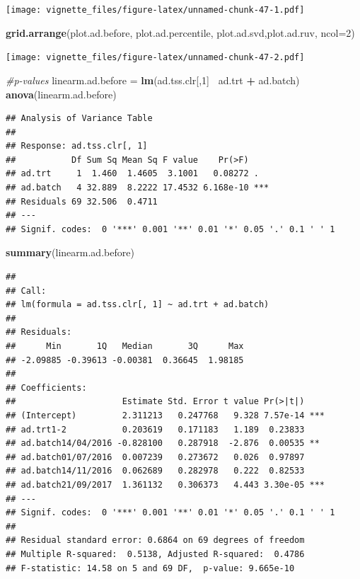 \documentclass[]{book}
\newenvironment{Shaded}{\begin{snugshade}}{\end{snugshade}}
\newcommand{\KeywordTok}[1]{\textcolor[rgb]{0.13,0.29,0.53}{\textbf{#1}}}
\newcommand{\DataTypeTok}[1]{\textcolor[rgb]{0.13,0.29,0.53}{#1}}
\newcommand{\DecValTok}[1]{\textcolor[rgb]{0.00,0.00,0.81}{#1}}
\newcommand{\StringTok}[1]{\textcolor[rgb]{0.31,0.60,0.02}{#1}}
\newcommand{\CommentTok}[1]{\textcolor[rgb]{0.56,0.35,0.01}{\textit{#1}}}
\newcommand{\OperatorTok}[1]{\textcolor[rgb]{0.81,0.36,0.00}{\textbf{#1}}}
\newcommand{\NormalTok}[1]{#1}
\begin{document}
\texttt{[image: vignette\_files/figure-latex/unnamed-chunk-47-1.pdf]}

\begin{Shaded}
\begin{Highlighting}[]
\KeywordTok{grid.arrange}\NormalTok{(plot.ad.before, plot.ad.percentile, plot.ad.svd,plot.ad.ruv, }\DataTypeTok{ncol=}\DecValTok{2}\NormalTok{)}
\end{Highlighting}
\end{Shaded}

\texttt{[image: vignette\_files/figure-latex/unnamed-chunk-47-2.pdf]}

\begin{Shaded}
\begin{Highlighting}[]
\CommentTok{#p-values}
\NormalTok{linearm.ad.before =}\StringTok{ }\KeywordTok{lm}\NormalTok{(ad.tss.clr[,}\DecValTok{1}\NormalTok{]}\OperatorTok{~}\StringTok{ }\NormalTok{ad.trt }\OperatorTok{+}\StringTok{ }\NormalTok{ad.batch)}
\KeywordTok{anova}\NormalTok{(linearm.ad.before)}
\end{Highlighting}
\end{Shaded}

\begin{verbatim}
## Analysis of Variance Table
## 
## Response: ad.tss.clr[, 1]
##           Df Sum Sq Mean Sq F value    Pr(>F)    
## ad.trt     1  1.460  1.4605  3.1001   0.08272 .  
## ad.batch   4 32.889  8.2222 17.4532 6.168e-10 ***
## Residuals 69 32.506  0.4711                      
## ---
## Signif. codes:  0 '***' 0.001 '**' 0.01 '*' 0.05 '.' 0.1 ' ' 1
\end{verbatim}

\begin{Shaded}
\begin{Highlighting}[]
\KeywordTok{summary}\NormalTok{(linearm.ad.before)}
\end{Highlighting}
\end{Shaded}

\begin{verbatim}
## 
## Call:
## lm(formula = ad.tss.clr[, 1] ~ ad.trt + ad.batch)
## 
## Residuals:
##      Min       1Q   Median       3Q      Max 
## -2.09885 -0.39613 -0.00381  0.36645  1.98185 
## 
## Coefficients:
##                     Estimate Std. Error t value Pr(>|t|)    
## (Intercept)         2.311213   0.247768   9.328 7.57e-14 ***
## ad.trt1-2           0.203619   0.171183   1.189  0.23833    
## ad.batch14/04/2016 -0.828100   0.287918  -2.876  0.00535 ** 
## ad.batch01/07/2016  0.007239   0.273672   0.026  0.97897    
## ad.batch14/11/2016  0.062689   0.282978   0.222  0.82533    
## ad.batch21/09/2017  1.361132   0.306373   4.443 3.30e-05 ***
## ---
## Signif. codes:  0 '***' 0.001 '**' 0.01 '*' 0.05 '.' 0.1 ' ' 1
## 
## Residual standard error: 0.6864 on 69 degrees of freedom
## Multiple R-squared:  0.5138, Adjusted R-squared:  0.4786 
## F-statistic: 14.58 on 5 and 69 DF,  p-value: 9.665e-10
\end{verbatim}
\end{document}
